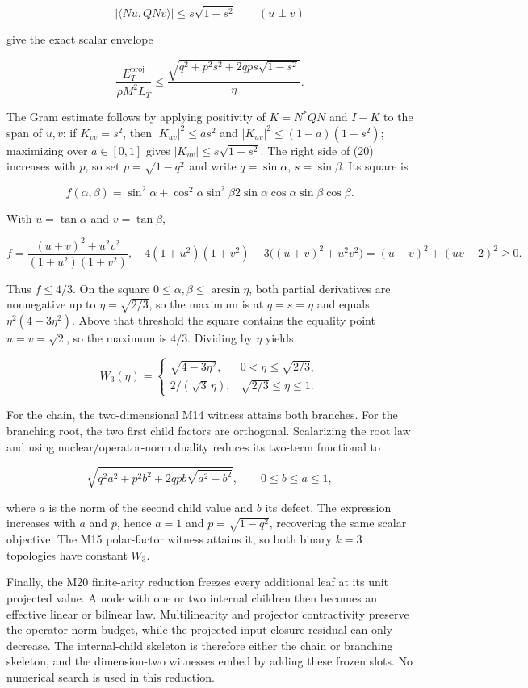 \documentclass[11pt]{amsart}
\theoremstyle{definition}
\theoremstyle{remark}
\begin{document}
\[
 |\langle Nu,QNv\rangle|
 \le s\sqrt{1-s^2}\qquad (u\perp v)
\]

give the exact scalar envelope

\[
 \frac{E_T^{\mathrm{proj}}}{\rho M^2L_T}
 \le
 \frac{\sqrt{q^2+p^2s^2+2qps\sqrt{1-s^2}}}{\eta}.
 \tag{20}
\]

The Gram estimate follows by applying positivity of $K=N^*QN$ and
$I-K$ to the span of $u,v$: if $K_{vv}=s^2$, then
$|K_{uv}|^2\le a s^2$ and $|K_{uv}|^2\le(1-a)(1-s^2)$; maximizing over
$a\in[0,1]$ gives $|K_{uv}|\le s\sqrt{1-s^2}$.  The right side of
(20) increases with $p$, so set $p=\sqrt{1-q^2}$ and write
$q=\sin\alpha$, $s=\sin\beta$.  Its square is

\[
 f(\alpha,\beta)=\sin^2\alpha+\cos^2\alpha\sin^2\beta
 2\sin\alpha\cos\alpha\sin\beta\cos\beta.
\]

With $u=\tan\alpha$ and $v=\tan\beta$,

\[
 f=\frac{(u+v)^2+u^2v^2}{(1+u^2)(1+v^2)},
\quad
 4(1+u^2)(1+v^2)-3\bigl((u+v)^2+u^2v^2\bigr)
 = (u-v)^2+(uv-2)^2\ge0.
\]

Thus $f\le4/3$.  On the square
$0\le\alpha,\beta\le\arcsin\eta$, both partial derivatives are
nonnegative up to $\eta=\sqrt{2/3}$, so the maximum is at
$q=s=\eta$ and equals $\eta^2(4-3\eta^2)$.  Above that threshold the
square contains the equality point $u=v=\sqrt2$, so the maximum is $4/3$.
Dividing by $\eta$ yields

\[
 W_3(\eta)=
 \begin{cases}
 \sqrt{4-3\eta^2},&0<\eta\le\sqrt{2/3},\\[1mm]
 2/(\sqrt3\,\eta),&\sqrt{2/3}\le\eta\le1.
 \end{cases}
\]

For the chain, the two-dimensional M14 witness attains both branches.  For
the branching root, the two first child factors are orthogonal.  Scalarizing
the root law and using nuclear/operator-norm duality reduces its two-term
functional to

\[
 \sqrt{q^2a^2+p^2b^2+2qpb\sqrt{a^2-b^2}},
 \qquad 0\le b\le a\le1,
\]

where $a$ is the norm of the second child value and $b$ its defect.  The
expression increases with $a$ and $p$, hence $a=1$ and
$p=\sqrt{1-q^2}$, recovering the same scalar objective.  The M15 polar-factor
witness attains it, so both binary $k=3$ topologies have constant $W_3$.

Finally, the M20 finite-arity reduction freezes every additional leaf at its
unit projected value.  A node with one or two internal children then becomes
an effective linear or bilinear law.  Multilinearity and projector
contractivity preserve the operator-norm budget, while the projected-input
closure residual can only decrease.  The internal-child skeleton is therefore
either the chain or branching skeleton, and the dimension-two witnesses embed
by adding these frozen slots.  No numerical search is used in this reduction.
\end{document}
